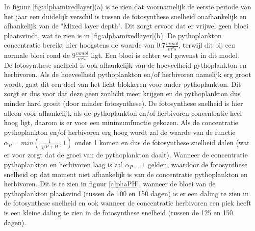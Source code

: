 In figuur \ref{fig:alphamixedlayer}(a) is te zien dat voornamelijk de eerste periode van het jaar een duidelijk verschil is tussen de fotosynthese snelheid onafhankelijk en afhankelijk van de "Mixed layer depth". Dit zorgt ervoor dat er vrijwel geen bloei plaatsvindt, wat te zien is in \ref{fig:alphamixedlayer}(b). De pythoplankton concentratie bereikt hier hoogstens de waarde van $0.7 \frac{mmol}{m^2s}$, terwijl dit bij een normale bloei rond de $9 \frac{mmol}{m^2s}$ ligt. Een bloei is echter wel gewenst in dit model.
\\
\newline
De fotosynthese snelheid is ook afhankelijk van de hoeveelheid pythoplankton en herbivoren. Als de hoeveelheid pythoplankton en/of herbivoren namelijk erg groot wordt, gaat dit een deel van het licht blokkeren voor ander pythoplankton. Dit zorgt er dus voor dat deze geen zonlicht meer krijgen en de pythoplankton dus minder hard groeit (door minder fotosynthese). De fotosynthese snelheid is hier alleen voor afhankelijk als de pythoplankton en/of herbivoren concentratie heel hoog ligt, daarom is er voor een minimumfunctie gekozen. Als de concentratie pythoplankton en/of herbivoren erg hoog wordt zal de waarde van de functie $\alpha_P=min(\frac{1}{\sqrt[3]{P+H}},1)$ onder 1 komen en dus de fotosynthese snelheid dalen (wat er voor zorgt dat de groei van de pythoplankton daalt). Wanneer de concentratie pythoplankton en herbivoren laag is zal $\alpha_P=1$ gelden, waardoor de fotosynthese snelheid op dat moment niet afhankelijk is van de concentratie pythoplankton en herbivoren. 
Dit is te zien in figuur \ref{alphaPH}, wanneer de bloei van de pythoplankton plaatsvind (tussen de 100 en 150 dagen) is er een daling te zien in de fotosynthese snelheid en ook wanneer de concentratie herbivoren een piek heeft is een kleine daling te zien in de fotosynthese snelheid (tussen de 125 en 150 dagen).

